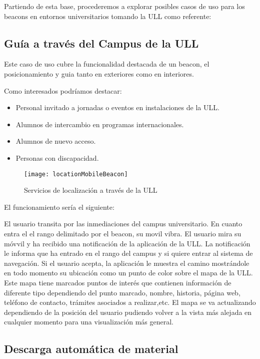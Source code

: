 Partiendo de esta base, procederemos a explorar posibles casos de uso para los beacons en entornos universitarios tomando la ULL como referente:

\subsection{Guía a través del Campus de la ULL}

Este caso de uso cubre la funcionalidad destacada de un beacon, el posicionamiento y guia tanto en exteriores como en interiores. 

Como interesados podríamos destacar: 

\begin{itemize}
\item Personal invitado a jornadas o eventos en instalaciones de la ULL.
\item Alumnos de intercambio en programas internacionales.
\item Alumnos de nuevo acceso.
\item Personas con discapacidad.
\end{itemize}

\begin{figure}[h]
	\centering
	\texttt{[image: locationMobileBeacon]}
	\caption{Servicios de localización a través de la ULL}
	\label{fig:beaconLocation}
\end{figure}

El funcionamiento sería el siguiente: 

El usuario transita por las inmediaciones del campus universitario. En cuanto entra el el rango delimitado por el beacon, su movil vibra. El usuario mira su móvvil y ha recibido una notificación de la aplicación de la ULL. La notificación le informa que ha entrado en el rango del campus y si quiere entrar al sistema de navegación. Si el usuario acepta, la aplicación le muestra el camino mostrándole en todo momento su ubicación como un punto de color sobre el mapa de la ULL. Este mapa tiene marcados puntos de interés que contienen información de diferente tipo dependiendo del punto marcado, nombre, historia, página web, teléfono de contacto, trámites asociados a realizar,etc. El mapa se va actualizando dependiendo de la posición del usuario pudiendo volver a la vista más alejada en cualquier momento para una visualización más general.


\subsection{Descarga automática de material}

